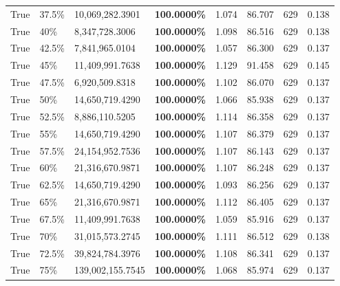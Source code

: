 \begin{table}[H]
\begin{tabular}{lllrllll}
\cline{1-8} \cline{2-8}
True & 37.5\% & 10,069,282.3901 & \bfseries \color{red} 100.0000\% & 1.074 & 86.707 & 629 & 0.138 \\
\cline{1-8} \cline{2-8}
True & 40\% & 8,347,728.3006 & \bfseries \color{red} 100.0000\% & 1.098 & 86.516 & 629 & 0.138 \\
\cline{1-8} \cline{2-8}
True & 42.5\% & 7,841,965.0104 & \bfseries \color{red} 100.0000\% & 1.057 & 86.300 & 629 & 0.137 \\
\cline{1-8} \cline{2-8}
True & 45\% & 11,409,991.7638 & \bfseries \color{red} 100.0000\% & 1.129 & 91.458 & 629 & 0.145 \\
\cline{1-8} \cline{2-8}
True & 47.5\% & 6,920,509.8318 & \bfseries \color{red} 100.0000\% & 1.102 & 86.070 & 629 & 0.137 \\
\cline{1-8} \cline{2-8}
True & 50\% & 14,650,719.4290 & \bfseries \color{red} 100.0000\% & 1.066 & 85.938 & 629 & 0.137 \\
\cline{1-8} \cline{2-8}
True & 52.5\% & 8,886,110.5205 & \bfseries \color{red} 100.0000\% & 1.114 & 86.358 & 629 & 0.137 \\
\cline{1-8} \cline{2-8}
True & 55\% & 14,650,719.4290 & \bfseries \color{red} 100.0000\% & 1.107 & 86.379 & 629 & 0.137 \\
\cline{1-8} \cline{2-8}
True & 57.5\% & 24,154,952.7536 & \bfseries \color{red} 100.0000\% & 1.107 & 86.143 & 629 & 0.137 \\
\cline{1-8} \cline{2-8}
True & 60\% & 21,316,670.9871 & \bfseries \color{red} 100.0000\% & 1.107 & 86.248 & 629 & 0.137 \\
\cline{1-8} \cline{2-8}
True & 62.5\% & 14,650,719.4290 & \bfseries \color{red} 100.0000\% & 1.093 & 86.256 & 629 & 0.137 \\
\cline{1-8} \cline{2-8}
True & 65\% & 21,316,670.9871 & \bfseries \color{red} 100.0000\% & 1.112 & 86.405 & 629 & 0.137 \\
\cline{1-8} \cline{2-8}
True & 67.5\% & 11,409,991.7638 & \bfseries \color{red} 100.0000\% & 1.059 & 85.916 & 629 & 0.137 \\
\cline{1-8} \cline{2-8}
True & 70\% & 31,015,573.2745 & \bfseries \color{red} 100.0000\% & 1.111 & 86.512 & 629 & 0.138 \\
\cline{1-8} \cline{2-8}
True & 72.5\% & 39,824,784.3976 & \bfseries \color{red} 100.0000\% & 1.108 & 86.341 & 629 & 0.137 \\
\cline{1-8} \cline{2-8}
True & 75\% & 139,002,155.7545 & \bfseries \color{red} 100.0000\% & 1.068 & 85.974 & 629 & 0.137 \\

\end{tabular}
\end{table}
